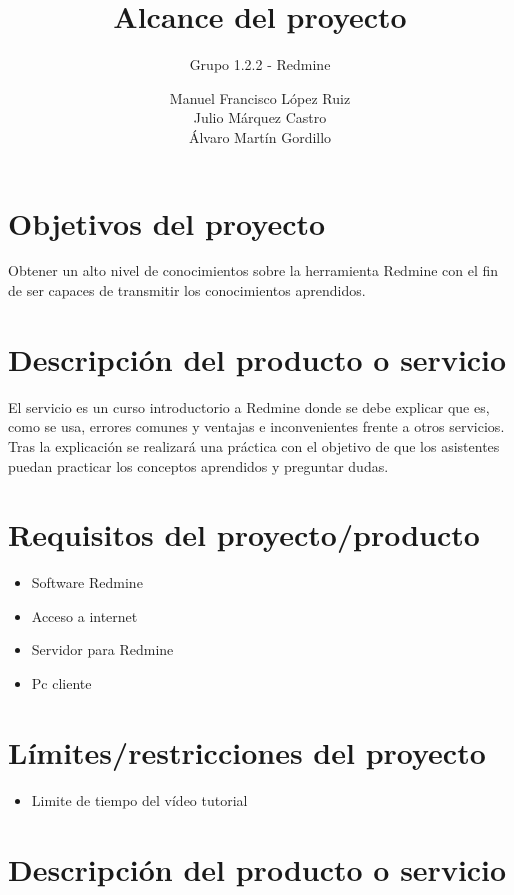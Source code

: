 \documentclass[a4paper,10pt]{scrartcl}
\title{Alcance del proyecto}
\subtitle{Grupo 1.2.2 - Redmine}
\author{
		Manuel Francisco López Ruiz\\
		Julio Márquez Castro\\
		Álvaro Martín Gordillo\\
		  }
\begin{document}
\clearpage\maketitle
\thispagestyle{empty}
\newpage

\tableofcontents

\newpage



\section{Objetivos del proyecto}

Obtener un alto nivel de conocimientos sobre la herramienta Redmine con el fin de ser capaces de transmitir los conocimientos aprendidos.

\section{Descripción del producto o servicio}

El servicio es un curso introductorio a Redmine donde se debe explicar que es, como se usa, errores comunes y ventajas e inconvenientes frente a otros servicios. Tras la explicación se realizará una práctica con el objetivo de que los asistentes puedan practicar los conceptos aprendidos y preguntar dudas.

\section{Requisitos del proyecto/producto}

\begin{itemize}
	\item Software Redmine
	\item Acceso a internet
	\item Servidor para Redmine
	\item Pc cliente
\end{itemize}

\section{Límites/restricciones del proyecto}

\begin{itemize}
	\item Limite de tiempo del vídeo tutorial
\end{itemize}

\section{Descripción del producto o servicio}
\end{document}
